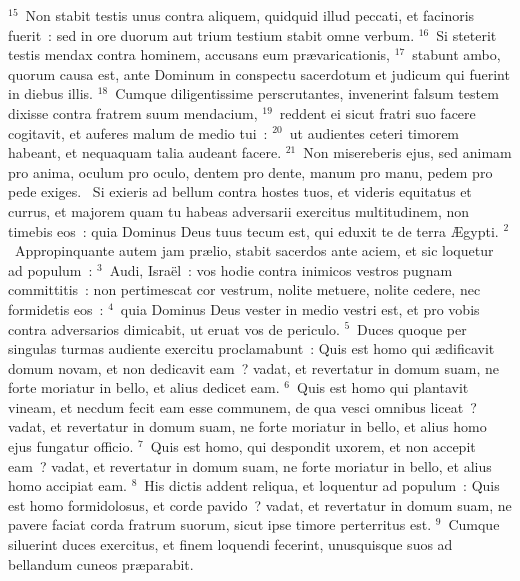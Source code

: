 ${}^{15}$~Non stabit testis unus contra aliquem, quidquid illud peccati, et facinoris fuerit~: sed in ore duorum aut trium testium stabit omne verbum.
${}^{16}$~Si steterit testis mendax contra hominem, accusans eum pr\ae varicationis,
${}^{17}$~stabunt ambo, quorum causa est, ante Dominum in conspectu sacerdotum et judicum qui fuerint in diebus illis.
${}^{18}$~Cumque diligentissime perscrutantes, invenerint falsum testem dixisse contra fratrem suum mendacium,
${}^{19}$~reddent ei sicut fratri suo facere cogitavit, et auferes malum de medio tui~:
${}^{20}$~ut audientes ceteri timorem habeant, et nequaquam talia audeant facere.
${}^{21}$~Non misereberis ejus, sed animam pro anima, oculum pro oculo, dentem pro dente, manum pro manu, pedem pro pede exiges.
~\lettrine[lines=10,image=true,loversize=0.05,lraise=-0.03]{S}{}i exieris ad bellum contra hostes tuos, et videris equitatus et currus, et majorem quam tu habeas adversarii exercitus multitudinem, non timebis eos~: quia Dominus Deus tuus tecum est, qui eduxit te de terra \AE gypti.
${}^{2}$~Appropinquante autem jam pr\ae lio, stabit sacerdos ante aciem, et sic loquetur ad populum~:
${}^{3}$~Audi, Isra\"el~: vos hodie contra inimicos vestros pugnam committitis~: non pertimescat cor vestrum, nolite metuere, nolite cedere, nec formidetis eos~:
${}^{4}$~quia Dominus Deus vester in medio vestri est, et pro vobis contra adversarios dimicabit, ut eruat vos de periculo.
${}^{5}$~Duces quoque per singulas turmas audiente exercitu proclamabunt~: Quis est homo qui \ae dificavit domum novam, et non dedicavit eam~? vadat, et revertatur in domum suam, ne forte moriatur in bello, et alius dedicet eam.
${}^{6}$~Quis est homo qui plantavit vineam, et necdum fecit eam esse communem, de qua vesci omnibus liceat~? vadat, et revertatur in domum suam, ne forte moriatur in bello, et alius homo ejus fungatur officio.
${}^{7}$~Quis est homo, qui despondit uxorem, et non accepit eam~? vadat, et revertatur in domum suam, ne forte moriatur in bello, et alius homo accipiat eam.
${}^{8}$~His dictis addent reliqua, et loquentur ad populum~: Quis est homo formidolosus, et corde pavido~? vadat, et revertatur in domum suam, ne pavere faciat corda fratrum suorum, sicut ipse timore perterritus est.
${}^{9}$~Cumque siluerint duces exercitus, et finem loquendi fecerint, unusquisque suos ad bellandum cuneos pr\ae parabit.


